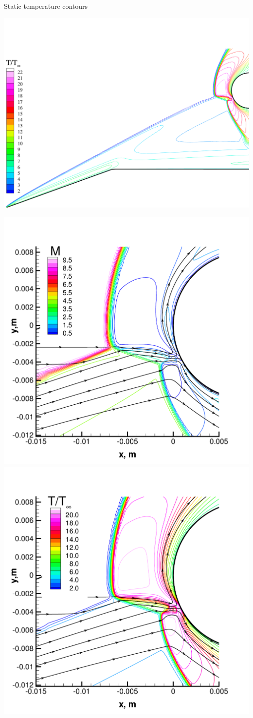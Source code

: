 \documentclass[compress,11pt]{beamer}
\begin{document}
\frame
{
  \begin{center}
    \scriptsize
    Static temperature contours
    
    \includegraphics[width=.95\textwidth]{figures/onera_type4_ssi/T_global}
  \end{center}
}

\frame
{
  \begin{center}
    \includegraphics[width=.48\textwidth]{figures/onera_type4_ssi/M_local}\includegraphics[width=.48\textwidth]{figures/onera_type4_ssi/T_local}
  \end{center}
}
\end{document}
